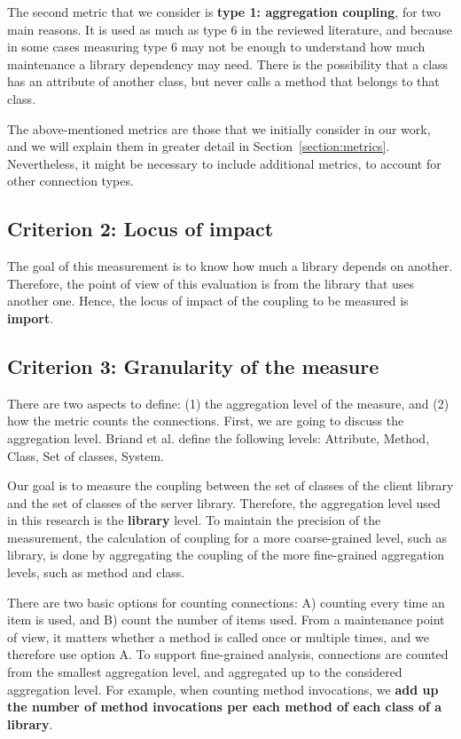 \documentclass[a4paper]{article}
\begin{document}
The second metric that we consider is \textbf{type 1: aggregation coupling}, for two main reasons. It is used as much as type 6 in the reviewed literature, and because in some cases measuring type 6 may not be enough to understand how much maintenance a library dependency may need. There is the possibility that a class has an attribute of another class, but never calls a method that belongs to that class.

The above-mentioned metrics are those that we initially consider in our work, and we will explain them in greater detail in Section~\ref{section:metrics}. Nevertheless, it might be necessary to include additional metrics, to account for other connection types.

\subsection{Criterion 2: Locus of impact}

The goal of this measurement is to know how much a library depends on another. Therefore, the point of view of this evaluation is from the library that uses another one. Hence, the locus of impact of the coupling to be measured is \textbf{import}.

\subsection{Criterion 3: Granularity of the measure}
There are two aspects to define: (1) the aggregation level of the measure, and (2) how the metric counts the connections.
First, we are going to discuss the aggregation level. Briand et al. define the following levels: Attribute, Method, Class, Set of classes, System.

Our goal is to measure the coupling between the set of classes of the client library and the set of classes of the server library.
Therefore, the aggregation level used in this research is the \textbf{library} level. To maintain the precision of the measurement, the calculation of coupling for a more coarse-grained level, such as library, is done by aggregating the coupling of the more fine-grained aggregation levels, such as method and class.

There are two basic options for counting connections: A) counting every time an item is used, and B) count the number of items used. From a maintenance point of view, it matters whether a method is called once or multiple times, and we therefore use option A.
To support fine-grained analysis, connections are counted from the smallest aggregation level, and aggregated up to the considered aggregation level.
For example, when counting method invocations, we  \textbf{add up the number of method invocations per each method of each class of a library}.
\end{document}
